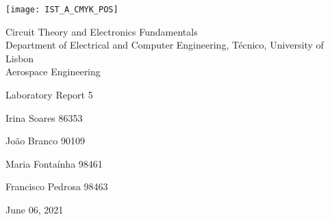
\thispagestyle {empty}

\texttt{[image: IST\_A\_CMYK\_POS]}

\begin{center}
%
\vspace{1.0cm}

\vspace{1cm}
{\FontLb Circuit Theory and Electronics Fundamentals} \\ %
\vspace{1cm}
{\FontSn Department of Electrical and Computer Engineering, Técnico, University of Lisbon} \\ %
\vspace{1cm}
{\FontSn Aerospace Engineering}


\vspace{1cm}
{\FontSn Laboratory Report 5} \\


\vspace{1cm}


{Irina Soares 86353}


\vspace{2mm}
{João Branco 90109}


\vspace{2mm}
{Maria Fontaínha 98461}


\vspace{2mm}
{Francisco Pedrosa 98463 }
\vspace{1cm}


{\FontSn June 06, 2021} \\ %
%
\end{center}
